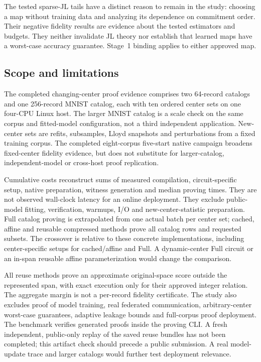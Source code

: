 \documentclass[5p,times,twocolumn]{elsarticle}
\theoremstyle{plain}
\theoremstyle{definition}
\theoremstyle{remark}
\begin{document}
\par\endgroup
\begingroup\color{RevisionRed}
The tested sparse-JL tails have a distinct reason to remain in the study: choosing a map without training data and analyzing its dependence on commitment order. Their negative fidelity results are evidence about the tested estimators and budgets. They neither invalidate JL theory nor establish that learned maps have a worst-case accuracy guarantee. Stage~1 binding applies to either approved map.


\par\endgroup
\subsection{\textcolor{RevisionRed}{Scope and limitations}}
\begingroup\color{RevisionRed}
The completed changing-center proof evidence comprises two 64-record catalogs and one 256-record MNIST catalog, each with ten ordered center sets on one four-CPU Linux host. The larger MNIST catalog is a scale check on the same corpus and fitted-model configuration, not a third independent application. New-center sets are refits, subsamples, Lloyd snapshots and perturbations from a fixed training corpus. The completed eight-corpus five-start native campaign broadens fixed-center fidelity evidence, but does not substitute for larger-catalog, independent-model or cross-host proof replication.


\par\endgroup
\begingroup\color{RevisionRed}
Cumulative costs reconstruct sums of measured compilation, circuit-specific setup, native preparation, witness generation and median proving times. They are not observed wall-clock latency for an online deployment. They exclude public-model fitting, verification, warmups, I/O and new-center-statistic preparation. Full catalog proving is extrapolated from one actual batch per center set; cached, affine and reusable compressed methods prove all catalog rows and requested subsets. The crossover is relative to these concrete implementations, including center-specific setups for cached/affine and Full. A dynamic-center Full circuit or an in-span reusable affine parameterization would change the comparison.


\par\endgroup
\begingroup\color{RevisionRed}
All reuse methods prove an approximate original-space score outside the represented span, with exact execution only for their approved integer relation. The aggregate margin is not a per-record fidelity certificate. The study also excludes proof of model training, real federated communication, arbitrary-center worst-case guarantees, adaptive leakage bounds and full-corpus proof deployment. The benchmark verifies generated proofs inside the proving CLI. A fresh independent, public-only replay of the saved reuse bundles has not been completed; this artifact check should precede a public submission. A real model-update trace and larger catalogs would further test deployment relevance.
\end{document}
